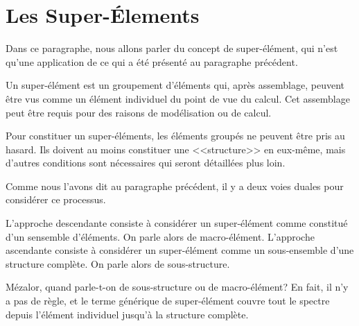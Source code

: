 





\medskip
\section{Les Super-Élements}

Dans ce paragraphe, nous allons parler du concept de super-élément, qui n'est qu'une
application de ce qui a été présenté au paragraphe précédent.

\medskip
Un super-élément est un groupement d'éléments qui, après 
assemblage, peuvent être vus comme un élément individuel du point de vue du calcul. 
Cet assemblage peut être requis pour des raisons de modélisation ou de calcul.

Pour constituer un super-éléments, les éléments groupés ne peuvent être
pris au hasard. Ils doivent au moins constituer une <<structure>> en eux-même, mais
d'autres conditions sont nécessaires qui seront détaillées plus loin.

Comme nous l'avons dit au paragraphe précédent, il y a deux voies duales pour considérer
ce processus.

L'approche descendante consiste à considérer un super-élément comme constitué
d'un sensemble d'éléments. On parle alors de macro-élément.
L'approche ascendante consiste à considérer un super-élément comme un sous-ensemble
d'une structure complète. On parle alors de sous-structure.

Mézalor, quand parle-t-on de sous-structure ou de macro-élément?
En fait, il n'y a pas de règle, et le terme générique de super-élément couvre tout le
spectre depuis l'élément individuel jusqu'à la structure complète.

